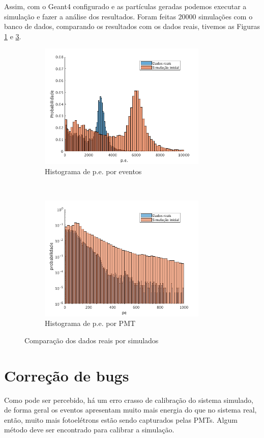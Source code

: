 Assim, com o Geant4 configurado e as partículas geradas podemos executar a simulação e fazer a análise dos resultados. Foram feitas $20000$ simulações com o banco de dados, comparando os resultados com os dados reais, tivemos as Figuras \ref{fig:a} e \ref{fig:b}.

\begin{figure}[ht]
	\centering
	\begin{subfigure}{0.5\textwidth}
		\centering
	\includegraphics[width=8cm]{textuais/simulacao/figuras/hist_evt1.png}
		\caption{Histograma de p.e. por eventos}
		\label{fig:a}
	\end{subfigure}%
	~ 
	\begin{subfigure}{0.5\textwidth}
		\centering
	\includegraphics[width=8cm]{textuais/simulacao/figuras/hist_pmt1.png}
		\caption{Histograma de p.e. por PMT}
				\label{fig:b}
	\end{subfigure}
	\caption{Comparação dos dados reais por simulados}
\end{figure}


\section{Correção de bugs} \label{sec:bugs}

Como pode ser percebido, há um erro crasso de calibração do sistema simulado, de forma geral os eventos apresentam muito mais energia  do que no sistema real, então, muito mais fotoelétrons estão sendo capturados pelas PMTs. Algum método deve ser encontrado para calibrar a simulação.

